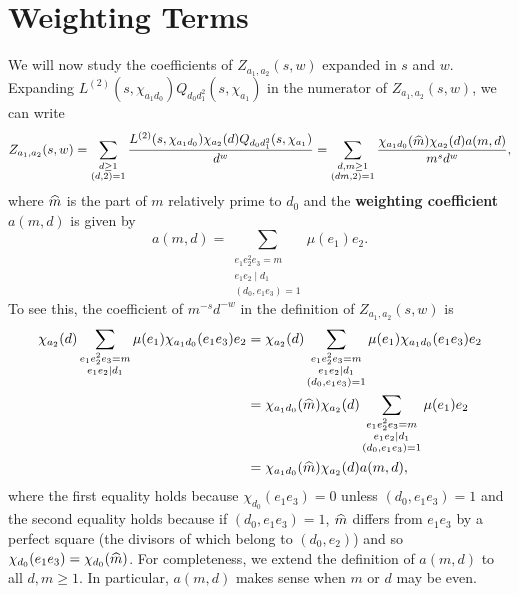 \section{Weighting Terms}
    We will now study the coefficients of $Z_{a_{1},a_{2}}(s,w)$ expanded in $s$ and $w$. Expanding $L^{(2)}(s,\chi_{a_{1}d_{0}})Q_{d_{0}d_{1}^{2}}(s,\chi_{a_{1}})$ in the numerator of $Z_{a_{1},a_{2}}(s,w)$, we can write
    \[
        Z_{a_{1},a_{2}}(s,w) = \sum_{\substack{d \ge 1 \\ (d,2) = 1}}\frac{L^{(2)}(s,\chi_{a_{1}d_{0}})\chi_{a_{2}}(d)Q_{d_{0}d_{1}^{2}}(s,\chi_{a_{1}})}{d^{w}} = \sum_{\substack{d,m \ge 1 \\ (dm,2) = 1}}\frac{\chi_{a_{1}d_{0}}(\widehat{m})\chi_{a_{2}}(d)a(m,d)}{m^{s}d^{w}},
    \]
    where $\widehat{m}$ is the part of $m$ relatively prime to $d_{0}$ and the \textbf{weighting coefficient} $a(m,d)$ is given by
    \[
        a(m,d) = \sum_{\substack{e_{1}e_{2}^{2}e_{3} = m \\ e_{1}e_{2} \mid d_{1} \\ (d_{0},e_{1}e_{3}) = 1}}\mu(e_{1})e_{2}.
    \]
    To see this, the coefficient of $m^{-s}d^{-w}$ in the definition of $Z_{a_{1},a_{2}}(s,w)$ is
    \begin{align*}
        \chi_{a_{2}}(d)\sum_{\substack{e_{1}e_{2}^{2}e_{3} = m \\ e_{1}e_{2} \mid d_{1}}}\mu(e_{1})\chi_{a_{1}d_{0}}(e_{1}e_{3})e_{2} &= \chi_{a_{2}}(d)\sum_{\substack{e_{1}e_{2}^{2}e_{3} = m \\ e_{1}e_{2} \mid d_{1} \\ (d_{0},e_{1}e_{3}) = 1}}\mu(e_{1})\chi_{a_{1}d_{0}}(e_{1}e_{3})e_{2} \\
        &= \chi_{a_{1}d_{0}}(\widehat{m})\chi_{a_{2}}(d)\sum_{\substack{e_{1}e_{2}^{2}e_{3} = m \\ e_{1}e_{2} \mid d_{1} \\ (d_{0},e_{1}e_{3}) = 1}}\mu(e_{1})e_{2} \\
        &= \chi_{a_{1}d_{0}}(\widehat{m})\chi_{a_{2}}(d)a(m,d),
    \end{align*}
    where the first equality holds because $\chi_{d_{0}}(e_{1}e_{3}) = 0$ unless $(d_{0},e_{1}e_{3}) = 1$ and the second equality holds because if $(d_{0},e_{1}e_{3}) = 1$, $\widehat{m}$ differs from $e_{1}e_{3}$ by a perfect square (the divisors of which belong to $(d_{0},e_{2})$) and so $\chi_{d_{0}}(e_{1}e_{3}) = \chi_{d_{0}}(\widehat{m})$. For completeness, we extend the definition of $a(m,d)$ to all $d,m \ge 1$. In particular, $a(m,d)$ makes sense when $m$ or $d$ may be even.
    
